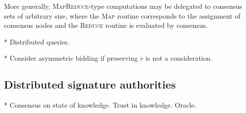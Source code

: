More generally, \textsc{MapReduce}-type  \cite{MapReduce} computations may be delegated to consensus sets of arbitrary size, where the \textsc{Map} routine corresponds to the assignment of consensus nodes and the \textsc{Reduce} routine is evaluated by consensus.

* Distributed queries.

* Consider asymmetric bidding if preserving $r$ is not a consideration.

\subsection{Distributed signature authorities}

* Consensus on state of knowledge. Trust in knowledge. Oracle.


